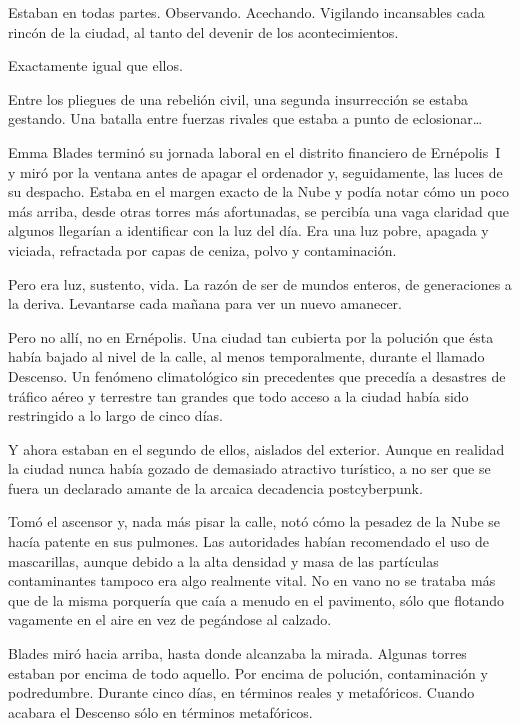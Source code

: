 Estaban en todas partes. Observando. Acechando. Vigilando incansables cada rincón de la ciudad, al tanto del devenir de los acontecimientos.

Exactamente igual que ellos.

Entre los pliegues de una rebelión civil, una segunda insurrección se estaba gestando. Una batalla entre fuerzas rivales que estaba a punto de eclosionar\dots

\fancyparbreak
Emma Blades terminó su jornada laboral en el distrito financiero de Ernépolis~I y miró por la ventana antes de apagar el ordenador y, seguidamente, las luces de su despacho. Estaba en el margen exacto de la Nube y podía notar cómo un poco más arriba, desde otras torres más afortunadas, se percibía una vaga claridad que algunos llegarían a identificar con la luz del día. Era una luz pobre, apagada y viciada, refractada por capas de ceniza, polvo y contaminación.

Pero era luz, sustento, vida. La razón de ser de mundos enteros, de generaciones a la deriva. Levantarse cada mañana para ver un nuevo amanecer.

Pero no allí, no en Ernépolis. Una ciudad tan cubierta por la polución que ésta había bajado al nivel de la calle, al menos temporalmente, durante el llamado Descenso. Un fenómeno climatológico sin precedentes que precedía a desastres de tráfico aéreo y terrestre tan grandes que todo acceso a la ciudad había sido restringido a lo largo de cinco días.

Y ahora estaban en el segundo de ellos, aislados del exterior. Aunque en realidad la ciudad nunca había gozado de demasiado atractivo turístico, a no ser que se fuera un declarado amante de la arcaica decadencia postcyberpunk.

Tomó el ascensor y, nada más pisar la calle, notó cómo la pesadez de la Nube se hacía patente en sus pulmones. Las autoridades habían recomendado el uso de mascarillas, aunque debido a la alta densidad y masa de las partículas contaminantes tampoco era algo realmente vital. No en vano no se trataba más que de la misma porquería que caía a menudo en el pavimento, sólo que flotando vagamente en el aire en vez de pegándose al calzado.

Blades miró hacia arriba, hasta donde alcanzaba la mirada. Algunas torres estaban por encima de todo aquello. Por encima de polución, contaminación y podredumbre. Durante cinco días, en términos reales y metafóricos. Cuando acabara el Descenso sólo en términos metafóricos.

